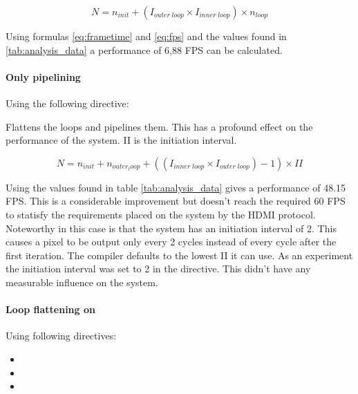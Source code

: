 \begin{equation}
N = n_{init} + (I_{outer\;loop} \times I_{inner\;loop}) \times n_{loop}
\end{equation}

\bigskip

Using formulas \ref{eq:frametime} and \ref{eq:fps} and the values found in \ref{tab:analysis_data} a performance of 6,88 FPS can be calculated. 

\paragraph{Only pipelining} Using the following directive:


Flattens the loops and pipelines them. This has a profound effect on the performance of the system. II is the initiation interval.


\begin{equation} \label{eq:only_pipelining}
N  = n_{init} + n_{outer_loop} + ((I_{inner\;loop} \times I_{outer\;loop}) - 1) \times II
\end{equation}

\bigskip

Using the values found in table \ref{tab:analysis_data} gives a performance of 48.15 FPS. This is a considerable improvement but doesn't reach the required 60 FPS to statisfy the requirements placed on the system by the HDMI protocol. Noteworthy in this case is that the system has an initiation interval of 2. This causes a pixel to be output only every 2 cycles instead of every cycle after the first iteration. The compiler defaults to the lowest II it can use. As an experiment the initiation interval was set to 2 in the directive. This didn't have any measurable influence on the system.

\paragraph{Loop flattening on}
Using following directives:

\begin{itemize}
\item {}
\item {}
\item {}
\end{itemize}

